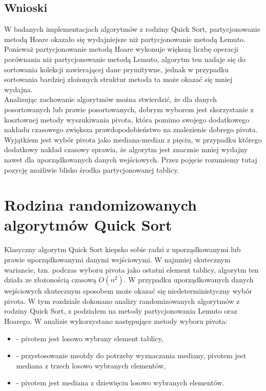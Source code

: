 \begin{figure}[]
	\centering
	
	\caption[]{}
	\label{fig:quick-sort-deterministic-pivot-all}
\end{figure}

\subsection{Wnioski}
W badanych implementacjach algorytmów z rodziny Quick Sort, partycjonowanie metodą Hoare okazało się wydajniejsze niż partycjonowanie metodą Lemuto. Ponieważ partycjonowanie metodą Hoare wykonuje większą liczbę operacji porównania niż partycjonowanie metodą Lemuto, algorytm ten nadaje się do sortowania kolekcji zawierającej dane prymitywne, jednak w przypadku sortowania bardziej złożonych struktur metoda ta może okazać się mniej wydajna.\\

Analizując zachowanie algorytmów można stwierdzić, że dla danych posortowanych lub prawie posortowanych, dobrym wyborem jest skorzystanie z kosztownej metody wyszukiwania pivota, która pomimo swojego dodatkowego nakładu czasowego zwiększa prawdopodobieństwo na znalezienie dobrego pivota. Wyjątkiem jest wybór pivota jako mediana-median z pięciu, w przypadku którego dodatkowy nakład czasowy sprawia, że algorytm jest znacznie mniej wydajny nawet dla uporządkowanych danych wejściowych. Przez pojęcie  rozumiemy tutaj pozycję możliwie blisko środka partycjonowanej tablicy.\\

\section{Rodzina randomizowanych algorytmów Quick Sort}
Klasyczny algorytm Quick Sort kiepsko sobie radzi z uporządkowanymi lub prawie uporządkowanymi danymi wejściowymi. W najmniej skutecznym wariancie, tzn. podczas wyboru pivota jako ostatni element tablicy, algorytm ten działa ze złożonością czasową $O(n^2)$. W przypadku uporządkowanych danych wejściowych skutecznym sposobem może okazać się niedeterministyczny wybór pivota. W tym rozdziale dokonano analizy randomizowanych algorytmów z rodziny Quick Sort, z podziałem na metody partycjonowania Lemuto oraz Hoarego. W analizie wykorzystano następujące metody wyboru pivota:

\begin{itemize}
	\setlength\itemsep{0em}
	\item {} - pivotem jest losowo wybrany element tablicy,
	\item {} - przystosowanie meotdy  do potrzeby wyznaczania mediany, pivotem jest mediana z trzech losowo wybranych elementów,
	\item {} - pivotem jest mediana z dziewięciu losowo wybranych elementów.\\
\end{itemize}

